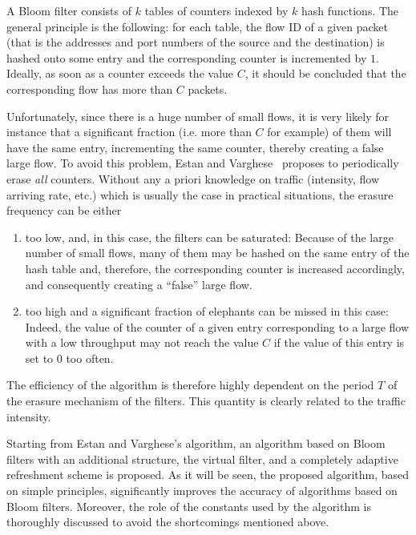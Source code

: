 \documentclass{amsart}
\begin{document}
A Bloom  filter consists of  $k$ tables  of counters indexed  by $k$ hash  functions.  The
general principle is the following: for each table, the flow ID of a given packet (that is
the addresses and  port numbers of the source  and the destination) is hashed onto  some entry and
the corresponding counter is incremented by $1$. Ideally, as soon as a counter exceeds the
value $C$, it should  be concluded that the corresponding flow has  more than $C$ packets.


Unfortunately, since there is a huge number of small flows, it is very likely for instance
that a significant fraction (i.e. more than $C$ for example) of them will have the same
entry, incrementing the same counter, thereby creating a false large flow.
To  avoid  this  problem,  Estan  and Varghese~\cite{Varghese}  proposes  to  periodically erase
{\em all} counters. Without any a priori  knowledge on traffic (intensity,
flow arriving rate, etc.) which is usually the case in practical situations, the erasure  frequency can be either
\begin{enumerate}
\item too  low, and, in this case, the filters can be saturated:  Because of the large number of
  small flows, many of them may be   hashed on the same entry of the hash table and,
  therefore, the corresponding counter is increased accordingly,  and consequently
  creating a ``false'' large flow.   
\item too high and a significant fraction of elephants can be missed in this case: Indeed,
  the value of the counter of a given entry corresponding to a large  flow with a low
  throughput may not reach the value $C$ if the value of this entry is set to $0$ too often. 
\end{enumerate}
The  efficiency of  the  algorithm is therefore highly dependent on  the  period $T$  of
the  erasure  mechanism of the filters. This quantity is clearly related to the traffic
intensity. 

Starting from Estan and Varghese's algorithm,  an algorithm  based on  Bloom filters with
an additional  structure, the virtual filter, and a completely adaptive  refreshment
scheme is proposed.  As it will be seen, the proposed algorithm, based on simple
principles, significantly improves  the accuracy of algorithms  based on  Bloom
filters. Moreover,  the role  of  the constants  used by  the algorithm is thoroughly
discussed to avoid the shortcomings mentioned above.  
\end{document}
